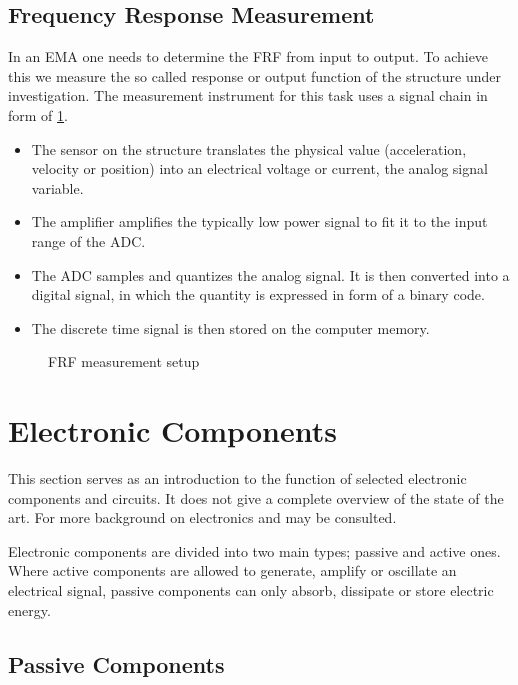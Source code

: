 \subsection{Frequency Response Measurement}

In an \ac{EMA} one needs to determine the \ac{FRF} from input to output. To achieve this we measure the so called response or output function of the structure under investigation. The measurement instrument for this task uses a signal chain in form of \ref{fig:measurement}.
\begin{itemize}
    \item The sensor on the structure translates the physical value (acceleration, velocity or position) into an electrical voltage or current, the analog signal variable.
    \item The amplifier amplifies the typically low power signal to fit it to the input range of the \ac{ADC}.
    \item The \ac{ADC} samples and quantizes the analog signal. It is then converted into a digital signal, in which the quantity is expressed in form of a binary code.
    \item The discrete time signal is then stored on the computer memory.
\end{itemize}

\begin{figure}[!htb]
    \centering
    
    \caption[Frequency Response Measurement]{\ac{FRF} measurement setup}
    \label{fig:measurement}
\end{figure}

\section{Electronic Components}

This section serves as an introduction to the function of selected electronic components and circuits. It does not give a complete overview of the state of the art. For more background on electronics \cite{Stiny2019AeB} and \cite{Tietze2008EC} may be consulted.

Electronic components are divided into two main types; passive and active ones. Where active components are allowed to generate, amplify or oscillate an electrical signal, passive components can only absorb, dissipate or store electric energy.

\subsection{Passive Components}


